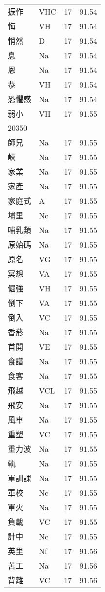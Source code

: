 \documentclass[twocolumn]{book}
\begin{document}
\begin{supertabular}{llrr}
振作 & VHC & 17 &  91.54\\
悔 & VH & 17 &  91.54\\
悄然 & D & 17 &  91.54\\
息 & Na & 17 &  91.54\\
恩 & Na & 17 &  91.54\\
恭 & VH & 17 &  91.54\\
恐懼感 & Na & 17 &  91.54\\
弱小 & VH & 17 &  91.55\\
20350\\
師兄 & Na & 17 &  91.55\\
峽 & Na & 17 &  91.55\\
家業 & Na & 17 &  91.55\\
家產 & Na & 17 &  91.55\\
家庭式 & A & 17 &  91.55\\
埔里 & Nc & 17 &  91.55\\
哺乳類 & Na & 17 &  91.55\\
原始碼 & Na & 17 &  91.55\\
原名 & VG & 17 &  91.55\\
冥想 & VA & 17 &  91.55\\
倔強 & VH & 17 &  91.55\\
倒下 & VA & 17 &  91.55\\
倒入 & VC & 17 &  91.55\\
香菸 & Na & 17 &  91.55\\
首開 & VE & 17 &  91.55\\
食譜 & Na & 17 &  91.55\\
食客 & Na & 17 &  91.55\\
飛越 & VCL & 17 &  91.55\\
飛安 & Na & 17 &  91.55\\
風車 & Na & 17 &  91.55\\
重塑 & VC & 17 &  91.55\\
重力波 & Na & 17 &  91.55\\
軌 & Na & 17 &  91.55\\
軍訓課 & Na & 17 &  91.55\\
軍校 & Nc & 17 &  91.55\\
軍火 & Na & 17 &  91.55\\
負載 & VC & 17 &  91.55\\
計中 & Nc & 17 &  91.55\\
英里 & Nf & 17 &  91.56\\
苦工 & Na & 17 &  91.56\\
背離 & VC & 17 &  91.56\\

\end{supertabular}
\end{document}
